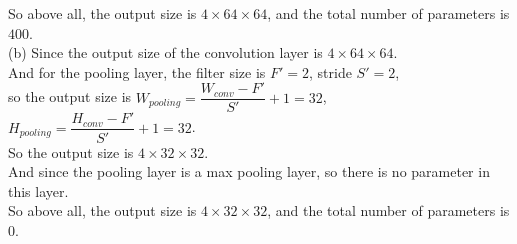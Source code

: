 \documentclass[10pt]{article}
\begin{document}
\begin{enumerate}[1.]
So above all, the output size is $4\times 64\times 64$, and the total number of parameters is $400$.\\

(b) Since the output size of the convolution layer is $4\times 64\times 64$.\\
And for the pooling layer, the filter size is $F' = 2$, stride $S'=2$,\\
so the output size is $W_{pooling}=\dfrac{W_{conv}-F'}{S'}+1=32$, $H_{pooling}=\dfrac{H_{conv}-F'}{S'}+1=32$.\\
So the output size is $4\times 32\times 32$.\\

And since the pooling layer is a max pooling layer, so there is no parameter in this layer.\\

So above all, the output size is $4\times 32\times 32$, and the total number of parameters is $0$.\\
	
	\newpage
	

\end{enumerate}
\end{document}
